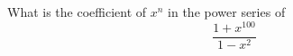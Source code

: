   What is the coefficient of $x^n$ in the power series of
  \[
    \frac{1 + x^{100}}{1 - x^2}
  \]
